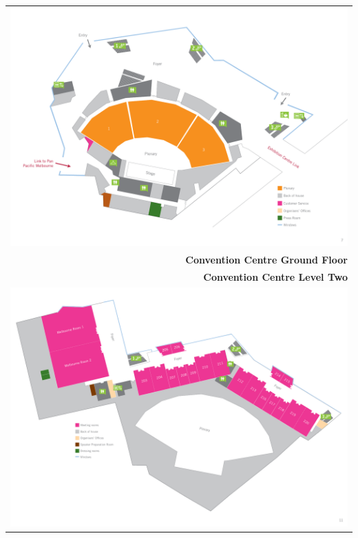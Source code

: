 \newpage
\thispagestyle{empty}
\begin{center}
  \begin{tabular}{r}
    \includegraphics[width=\textwidth]{content/maps/mcec_floor1.pdf} \\
    \textbf{Convention Centre Ground Floor}\\\hline
    \textbf{Convention Centre Level Two}\\
    \includegraphics[width=\textwidth]{content/maps/mcec_floor2.pdf}
  \end{tabular}
\end{center}
